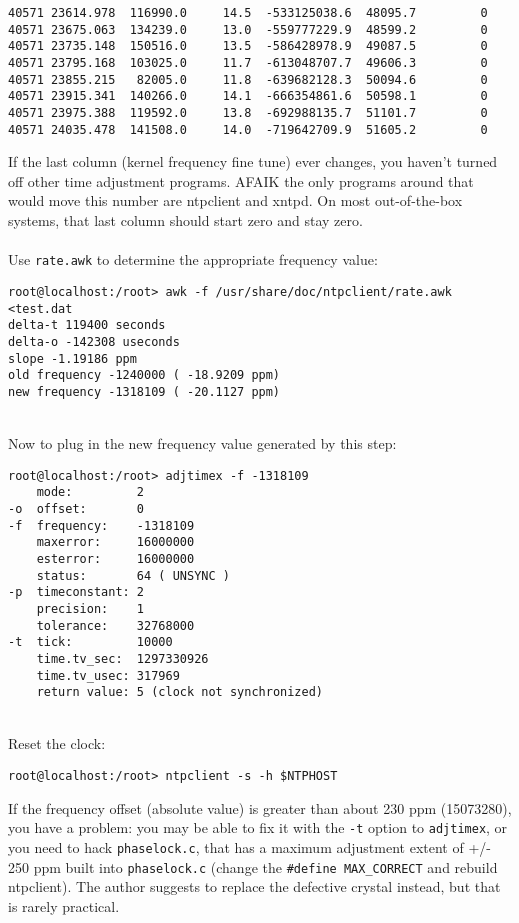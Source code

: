 \documentclass[a4paper]{report}
\begin{document}
\begin{enumerate}
\begin{lstlisting}
40571 23614.978  116990.0     14.5  -533125038.6  48095.7         0
40571 23675.063  134239.0     13.0  -559777229.9  48599.2         0
40571 23735.148  150516.0     13.5  -586428978.9  49087.5         0
40571 23795.168  103025.0     11.7  -613048707.7  49606.3         0
40571 23855.215   82005.0     11.8  -639682128.3  50094.6         0
40571 23915.341  140266.0     14.1  -666354861.6  50598.1         0
40571 23975.388  119592.0     13.8  -692988135.7  51101.7         0
40571 24035.478  141508.0     14.0  -719642709.9  51605.2         0
\end{lstlisting}
If the last column (kernel frequency fine tune) ever changes, you haven't
turned off other time adjustment programs.  AFAIK the only programs around
that would move this number are ntpclient and xntpd.  On most out-of-the-box
systems, that last column should start zero and stay zero.\\\\
Use {\tt rate.awk} to determine the appropriate frequency value:
\begin{lstlisting}
root@localhost:/root> awk -f /usr/share/doc/ntpclient/rate.awk <test.dat
delta-t 119400 seconds
delta-o -142308 useconds
slope -1.19186 ppm
old frequency -1240000 ( -18.9209 ppm)
new frequency -1318109 ( -20.1127 ppm)
\end{lstlisting}\null\\
Now to plug in the new frequency value generated by this step:
\begin{lstlisting}
root@localhost:/root> adjtimex -f -1318109
    mode:         2
-o  offset:       0
-f  frequency:    -1318109
    maxerror:     16000000
    esterror:     16000000
    status:       64 ( UNSYNC )
-p  timeconstant: 2
    precision:    1
    tolerance:    32768000
-t  tick:         10000
    time.tv_sec:  1297330926
    time.tv_usec: 317969
    return value: 5 (clock not synchronized)
\end{lstlisting}\null\\
Reset the clock:
\begin{lstlisting}
root@localhost:/root> ntpclient -s -h $NTPHOST
\end{lstlisting}
If the frequency offset (absolute value) is greater than about 230 ppm
(15073280), you have a problem: you may be able to fix it with the {\tt -t}
option to {\tt adjtimex}, or you need to hack {\tt phaselock.c}, that has a
maximum adjustment extent of +/- 250 ppm built into {\tt phaselock.c} (change
the {\tt #define MAX\_CORRECT} and rebuild ntpclient). The author suggests to
replace the defective crystal instead, but that is rarely practical.\\\\

\end{enumerate}
\end{document}
